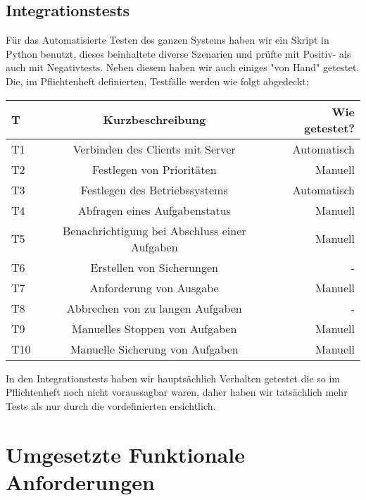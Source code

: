\documentclass[a4paper,12pt]{article}
\begin{document}
\subsection{Integrationstests}
\vspace{0.2cm}
Für das Automatisierte Testen des ganzen Systems haben wir ein Skript in Python benutzt, dieses beinhaltete diverse Szenarien und prüfte mit Positiv- als auch mit Negativtests. Neben diesem haben wir auch einiges "von Hand" getestet.
Die, im Pflichtenheft definierten, Testfälle werden wie folgt abgedeckt: \newline
\begin{tabular}{|l|c|r|}
	\hline
	T & Kurzbeschreibung & Wie getestet? \\ \hline \hline
	T1 & Verbinden des Clients mit Server & Automatisch \\ \hline
	T2 & Festlegen von Prioritäten & Manuell \\ \hline
	T3 & Festlegen des Betriebssystems & Automatisch \\ \hline
	T4 & Abfragen eines Aufgabenstatus & Manuell \\ \hline
	T5 & Benachrichtigung bei Abschluss einer Aufgaben & Manuell \\ \hline
	T6 & Erstellen von Sicherungen & - \\ \hline
	T7 & Anforderung von Ausgabe & Manuell \\ \hline
	T8 & Abbrechen von zu langen Aufgaben & - \\ \hline
	T9 & Manuelles Stoppen von Aufgaben & Manuell \\ \hline
	T10 & Manuelle Sicherung von Aufgaben & Manuell \\ \hline
\end{tabular}
\newline \newline
In den Integrationstests haben wir hauptsächlich Verhalten getestet die so im Pflichtenheft noch nicht voraussagbar waren, daher haben wir tatsächlich mehr Tests als nur durch die vordefinierten ersichtlich.
\section{Umgesetzte Funktionale Anforderungen}
\end{document}
